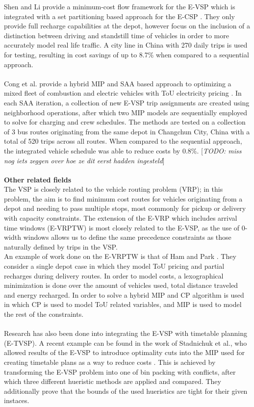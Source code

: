 \documentclass[ht]{article}
\newcommand{\todo}[1]{{\color{red}[\textit{TODO: #1}]}}
\begin{document}
Shen and Li provide a minimum-cost flow framework for the E-VSP which is
integrated with a set partitioning based approach for the E-CSP
\cite{Shen2023}. They only provide full recharge capabilities at the depot,
however focus on the inclusion of a distinction between driving and standstill
time of vehicles in order to more accurately model real life traffic. A city
line in China with 270 daily trips is used for testing, resulting in cost
savings of up to 8.7\% when compared to a sequential approach. \\\\

Cong et al. provide a hybrid MIP and SAA based approach to optimizing a mixed
fleet of combustion and electric vehicles with ToU electricity pricing
\cite{Cong2024}. In each SAA iteration, a collection of new E-VSP trip
assignments are created using neighborhood operations, after which two MIP
models are sequentially employed to solve for charging and crew schedules. The
methods are tested on a collection of 3 bus routes originating from the same
depot in Changchun City, China with a total of 520 trips across all routes.
When compared to the sequential approach, the integrated vehicle schedule was
able to reduce costs by 0.8\%. \todo{miss nog iets zeggen over hoe ze dit eerst
  hadden ingesteld} \\\\

\noindent \textbf{Other related fields}\\
The VSP is closely related to the vehicle routing problem (VRP); in this problem, the aim is to find minimum cost routes for vehicles originating from a depot and needing to pass multiple stops, most commonly for pickup or delivery with capacity constraints. The extension of the E-VRP which includes arrival time windows (E-VRPTW) is most closely related to the E-VSP, as the use of 0-width windows allows us to define the same precedence constraints as those naturally defined by trips in the VSP. \\
An example of work done on the E-VRPTW is that of Ham and Park \cite{Ham2021}. They consider a single depot case in which they model ToU pricing and partial recharges during delivery routes. In order to model costs, a lexographical minimization is done over the amount of vehicles used, total distance traveled and energy recharged. In order to solve a hybrid MIP and CP algorithm is used in which CP is used to model ToU related variables, and MIP is used to model the rest of the constraints. \\\\
Research has also been done into integrating the E-VSP with timetable planning (E-TVSP). A recent example can be found in the work of Stadnichuk et al., who allowed results of the E-VSP to introduce optimality cuts into the MIP used for creating timetable plans as a way to reduce costs \cite{Stadnichuk2024}. This is achieved by transforming the E-VSP problem into one of bin packing with conflicts, after which three different hueristic methods are applied and compared. They additionally prove that the bounds of the used hueristics are tight for their given instaces. \\\\
\end{document}
